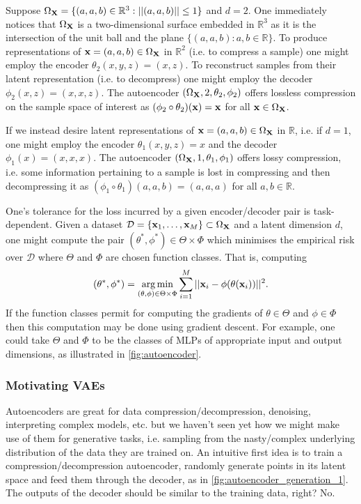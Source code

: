 \documentclass[11pt]{article}
\begin{document}
\begin{tcolorbox}[title={\centering\textbf{Autoencoder example}}, colback=myLightBlue, colbacktitle=myDarkBlue, colframe=myDarkBlue, coltitle=white]
    Suppose $\Omega_{\mathbf{X}}=\{(a,a,b)\in\mathbb{R}^3:||(a,a,b)||\leq1\}$ and $d=2$. One immediately notices that $\Omega_{\mathbf{X}}$ is a two-dimensional surface embedded in $\mathbb{R}^3$ as it is the intersection of the unit ball and the plane $\{(a,a,b):a,b\in\mathbb{R}\}$. To produce representations of $\mathbf{x}=(a,a,b)\in\Omega_{\mathbf{X}}$ in $\mathbb{R}^2$ (i.e. to compress a sample) one might employ the encoder $\theta_2(x,y,z)=(x,z)$. To reconstruct samples from their latent representation (i.e. to decompress) one might employ the decoder $\phi_2(x,z)=(x,x,z)$. The autoencoder $(\Omega_{\mathbf{X}},2,\theta_2,\phi_2)$ offers lossless compression on the sample space of interest as $(\phi_2\circ\theta_2)(\mathbf{x})=\mathbf{x}$ for all $\mathbf{x}\in\Omega_{\mathbf{X}}$.
    
    \hspace{15pt} If we instead desire latent representations of $\mathbf{x}=(a,a,b)\in\Omega_{\mathbf{X}}$ in $\mathbb{R}$, i.e. if $d=1$, one might employ the encoder $\theta_1(x,y,z)=x$ and the decoder $\phi_1(x)=(x,x,x)$. The autoencoder $(\Omega_{\mathbf{X}},1,\theta_1,\phi_1)$ offers lossy compression, i.e. some information pertaining to a sample is lost in compressing and then decompressing it as $(\phi_1\circ\theta_1)(a,a,b)=(a,a,a)$ for all $a,b\in\mathbb{R}$.
\end{tcolorbox}

One's tolerance for the loss incurred by a given encoder/decoder pair is task-dependent. Given a dataset $\mathcal{D}=\{\mathbf{x}_1,\dots,\mathbf{x}_M\}\subset\Omega_{\mathbf{X}}$ and a latent dimension $d$, one might compute the pair $(\theta^*,\phi^*)\in\Theta\times\Phi$ which minimises the empirical risk over $\mathcal{D}$ where $\Theta$ and $\Phi$ are chosen function classes. That is, computing
$$
(\theta^*,\phi^*)
=
\operatorname*{arg\,min}_{(\theta,\phi)\in\Theta\times\Phi}
\sum_{i=1}^M||\mathbf{x}_i-\phi(\theta(\mathbf{x}_i))||^2.
$$
If the function classes permit for computing the gradients of $\theta\in\Theta$ and $\phi\in\Phi$ then this computation may be done using gradient descent. For example, one could take $\Theta$ and $\Phi$ to be the classes of MLPs of appropriate input and output dimensions, as illustrated in \autoref{fig:autoencoder}.

\subsubsection{Motivating VAEs}
Autoencoders are great for data compression/decompression, denoising, interpreting complex models, etc. but we haven't seen yet how we might make use of them for generative tasks, i.e. sampling from the nasty/complex underlying distribution of the data they are trained on. An intuitive first idea is to train a compression/decompression autoencoder, randomly generate points in its latent space and feed them through the decoder, as in \autoref{fig:autoencoder_generation_1}. The outputs of the decoder should be similar to the training data, right? No.
\end{document}
